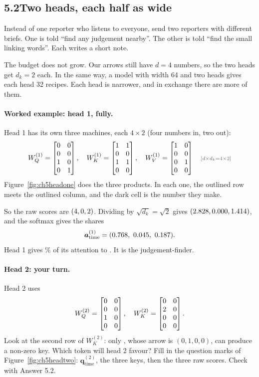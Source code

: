 
\subsection*{5.2\quad Two heads, each half as wide}

\Picture Instead of one reporter who listens to everyone, send two reporters with different briefs. One is
told ``find any judgement nearby''. The other is told ``find the small linking words''. Each writes a short
note.

The budget does not grow. Our arrows still have $d=4$ numbers, so the two heads get $d_k=2$ each. In the
same way, a model with width 64 and two heads gives each head 32 recipes. Each head is narrower, and in exchange there are more of them.

\paragraph{Worked example: head 1, fully.} Head 1 has its own three machines, each $4\times2$ (four
numbers in, two out):
\[
W_Q^{(1)}=\nFiveWQone,\quad W_K^{(1)}=\nFiveWKone,\quad W_V^{(1)}=\nFiveWVone \shape{d\times d_k=4\times2}
\]
Figure~\ref{fig:ch5headone} does the three products. In each one, the outlined row meets the outlined
column, and the dark cell is the number they make.

\begin{center}
\fitwidthFourFive{}
\label{fig:ch5headone}
\end{center}

So the raw scores are $(4, 0, 2)$. Dividing by $\sqrt{d_k}=\sqrt2$ gives $(2.828, 0.000, 1.414)$, and the softmax gives the shares
\[
\bm{a}^{(1)}_{\text{time}} = (\nFiveAoneWaste,\ \nFiveAoneOf,\ \nFiveAoneTime).
\]
Head 1 gives \nFivePoneWaste\% of its attention to . It is the judgement-finder.

\paragraph{Head 2: your turn.} Head 2 uses
\[
W_Q^{(2)}=\begin{bmatrix}0 & 0 \\ 0 & 0 \\ 1 & 0 \\ 0 & 0\end{bmatrix},\quad W_K^{(2)}=\begin{bmatrix}0 & 0 \\ 2 & 0 \\ 0 & 0 \\ 0 & 0\end{bmatrix} .
\]
\Predict Look at the second row of $W_K^{(2)}$: only , whose arrow is $(0,1,0,0)$, can produce a
non-zero key. Which token will head 2 favour? Fill in the question marks of Figure~\ref{fig:ch5headtwo}:
$\bm{q}^{(2)}_{\text{time}}$, the three keys, then the three raw scores. Check with Answer 5.2.

